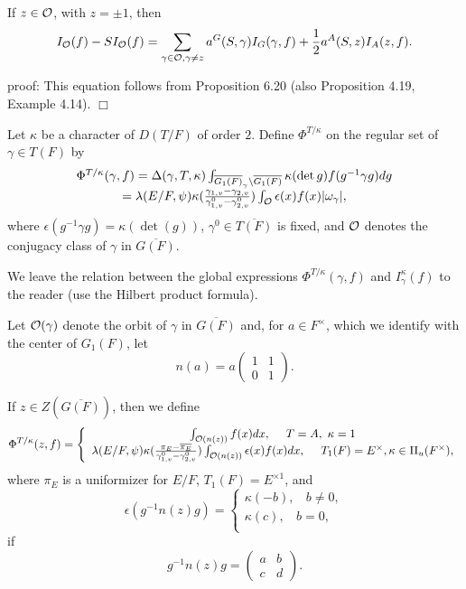 \begin{lemma} If $z\in {\cal{O}}$, with $z=\pm 1$, then
\[
I_{\cal O}(f)-SI_{\cal O}(f)=
\sum_{ \gamma\in {\cal{O}}, \gamma\not= z}
a^G(S,\gamma)I_G(\gamma,f)+
{1\over 2}a^A(S,z)I_A(z,f).
\]
\end{lemma}
proof: This equation follows from Proposition 6.20
(also Proposition 4.19, Example 4.14). $\Box$

\begin{definition}
Let $\kappa$ be a character of
$D(T/F)$ of order $2$.
Define $\Phi^{T/\kappa}$ on the regular set of $\gamma\in T(F)$ by
\[
\begin{array}{c}
\Phi^{T/\kappa}(\gamma,f)=
\Delta(\gamma,T,\kappa)
\int_{\overline{G_1(F)}_\gamma\backslash \overline{G_1(F)}}
\kappa(\det{g})f(g^{-1}\gamma g)dg\\
=
\lambda(E/F,\psi)
\kappa({\gamma_{1,v}-\gamma_{2,v}\over \gamma_{1,v}^0-\gamma_{2,v}^0})
\int_{\cal{O}}\epsilon(x)f(x)|\omega_\gamma|,
\end{array}
\]
where $\epsilon(g^{-1}\gamma g)=\kappa(\det(g))$,
$\gamma^0\in \overline{T(F)}$
is fixed, and $\cal{O}$ denotes the conjugacy class of
$\gamma$ in $\overline{G(F)}$.
\end{definition}

We leave the relation between the global expressions
$\Phi^{T/\kappa}(\gamma,f)$ and $I^\kappa_\gamma(f)$ to
the reader (use the Hilbert product formula).

Let ${\cal{O}}(\gamma)$ denote the orbit of
$\gamma$ in $\overline{G(F)}$ and,
for $a\in F^\times$, which we identify with the center of $G_1(F)$, let
\[
n(a)=a
\left(
\begin{array}{cc}
1&1\\ 0&1
\end{array}
\right).
\]

\begin{definition} If $z\in Z(\overline{G(F)})$, then we define
\[
\Phi^{T/\kappa}(z,f)
=
\left\{
\begin{array}{c}
\int_{{\cal{O}}(n(z))}
f(x)dx,\ \ \ \ T=A,\ \kappa =1\\
\lambda(E/F,\psi)
\kappa({\pi_E-\overline{\pi_E}\over \gamma_{1,v}^0-\gamma_{2,v}^0})
\int_{{\cal{O}}(n(z))}\epsilon(x)f(x)dx,\ \ \ \ T_1(F)=E^\times,
\kappa\in \Pi_u(F^\times),
\end{array}
\right.
\]
where $\pi_E$ is a uniformizer for $E/F$, $T_1(F)=E^{\times 1}$,
and
\[
\epsilon(g^{-1}n(z)g)=
\left\{
\begin{array}{c}
\kappa(-b),\ \ \ \ b\not= 0,\\
\kappa(c),\ \ \ \ b= 0,\\
\end{array}
\right.
\]
if
\[
g^{-1}n(z)g=
\left(
\begin{array}{cc}
a&b\\c&d
\end{array}
\right).
\]
\end{definition}


